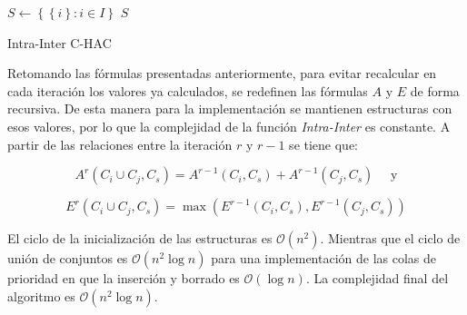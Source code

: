 \begin{center}
	\begin{algorithm}[H]
	\DontPrintSemicolon
	\SetAlgoLined
		$S \leftarrow \left\{\left\{i\right\}: i \in I\right\}$\;
		\Return $S$\;
	\caption{Intra-Inter C-HAC}\label{alg:Intra-Inter C-HAC}
	\end{algorithm}
\end{center}

Retomando las fórmulas presentadas anteriormente, para evitar recalcular en cada iteración los valores ya calculados, se redefinen las fórmulas $A$ y $E$ de forma recursiva. De esta manera para la implementación se mantienen estructuras con esos valores, por lo que la complejidad de la función \textit{Intra-Inter} es constante. A partir de las relaciones entre la iteración $r$ y $r-1$ se tiene que:

$$A^r(C_i \cup C_j, C_s) = A^{r-1}(C_i,C_s) + A^{r-1}(C_j,C_s) \quad \mbox{ y}$$

$$E^r(C_i \cup C_j,C_s) = \max (E^{r-1}(C_i,C_s),E^{r-1}(C_j,C_s))$$

El ciclo de la inicialización de las estructuras es $\mathcal{O}(n^{2})$. Mientras que el ciclo de unión de conjuntos es $\mathcal{O}(n^{2}\log n)$ para una implementación de las colas de prioridad en que la inserción y borrado es $\mathcal{O}(\log n)$. La complejidad final del algoritmo es $\mathcal{O}(n^{2}\log n)$.

